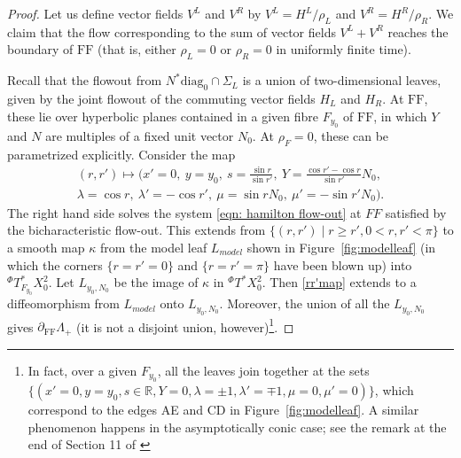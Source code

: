 \documentclass[10pt, a4paper, twoside]{amsart}
\numberwithin{equation}{section}
\theoremstyle{remark}
\begin{document}
\begin{proof}
Let us define vector fields $V^L$ and $V^R$ by $V^L = H^L/\rho_L$ and $V^R = H^R/\rho_R$. We claim that the flow corresponding to the sum of vector fields $V^L + V^R$  reaches the boundary of ${\mathrm{FF}}$ (that is, either $\rho_L = 0$ or $\rho_R = 0$ in uniformly finite time). 

Recall that the flowout from $N^* {\mathrm{diag}_0} \cap \Sigma_L$ is a union of two-dimensional leaves, given by the joint flowout of the commuting vector fields $H_L$ and $H_R$.  At  ${\mathrm{FF}}$, these lie over hyperbolic planes contained in a given fibre $F_{y_0}$ of ${\mathrm{FF}}$, in which $Y$ and $N$ are multiples of a fixed unit vector $N_0$. At $\rho_F = 0$, these can be parametrized explicitly.  Consider the map 
\begin{equation}\begin{gathered}
(r, r') \mapsto \big( x' = 0, \ y = y_0,  \ s = \frac{\sin r}{\sin r'}, \ Y = \frac{\cos r' - \cos r}{\sin r'} N_0,  \\
\lambda = \cos r, \ \lambda' = -\cos r', \ \mu = \sin r N_0, \ \mu' = - \sin r' N_0 
 \big). 
\end{gathered}\label{rr'map}\end{equation}
The right hand side solves the system \eqref{eqn: hamilton flow-out} at $FF$ satisfied by the bicharacteristic flow-out.
This extends from $\{ (r, r') \mid r \geq r', 0 < r, r'  < \pi \}$ to a smooth map $\kappa$  from the model leaf $L_{model}$ shown in Figure~\ref{fig:modelleaf}  (in which the corners $\{ r = r' = 0 \}$ and $\{ r = r' = \pi \}$ have been blown up) into ${}^\Phi T^*_{F_{y_0}} X^2_0$. Let $L_{y_0, N_0}$ be the image of $\kappa$ in ${}^\Phi T^* X^2_0$. Then \eqref{rr'map} extends to a diffeomorphism from $L_{model}$ onto $L_{y_0, N_0}$. Moreover, the union of all the $L_{y_0, N_0}$ gives $\partial_{\mathrm{FF}} \Lambda_+$ (it is not a disjoint union, however)\footnote{In fact, over a given  $F_{y_0}$, all the leaves join together at the sets $\{ (x' = 0, y = y_0, s \in {\mathbb{R}}, Y = 0, \lambda = \pm 1, \lambda' = \mp 1, \mu = 0, \mu' = 0) \}$, which correspond to the edges AE and CD in Figure~\ref{fig:modelleaf}. A similar phenomenon happens in the asymptotically conic case; see the remark at the end of Section 11 of \cite{Hassell-Wunsch}}. 


\end{proof}
\end{document}
